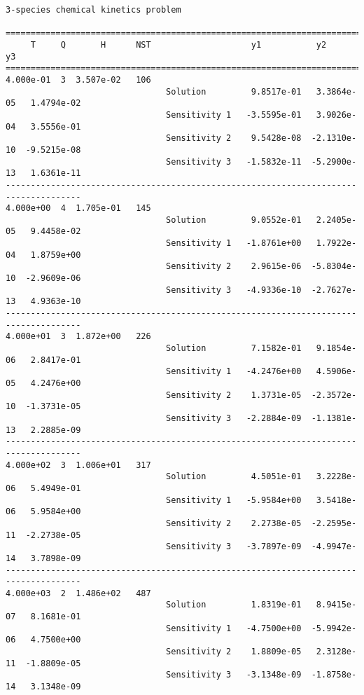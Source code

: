 \begin{verbatim}
3-species chemical kinetics problem

=====================================================================================
     T     Q       H      NST                    y1           y2           y3    
=====================================================================================
4.000e-01  3  3.507e-02   106
                                Solution         9.8517e-01   3.3864e-05   1.4794e-02 
                                Sensitivity 1   -3.5595e-01   3.9026e-04   3.5556e-01 
                                Sensitivity 2    9.5428e-08  -2.1310e-10  -9.5215e-08 
                                Sensitivity 3   -1.5832e-11  -5.2900e-13   1.6361e-11 
-------------------------------------------------------------------------------------
4.000e+00  4  1.705e-01   145
                                Solution         9.0552e-01   2.2405e-05   9.4458e-02 
                                Sensitivity 1   -1.8761e+00   1.7922e-04   1.8759e+00 
                                Sensitivity 2    2.9615e-06  -5.8304e-10  -2.9609e-06 
                                Sensitivity 3   -4.9336e-10  -2.7627e-13   4.9363e-10 
-------------------------------------------------------------------------------------
4.000e+01  3  1.872e+00   226
                                Solution         7.1582e-01   9.1854e-06   2.8417e-01 
                                Sensitivity 1   -4.2476e+00   4.5906e-05   4.2476e+00 
                                Sensitivity 2    1.3731e-05  -2.3572e-10  -1.3731e-05 
                                Sensitivity 3   -2.2884e-09  -1.1381e-13   2.2885e-09 
-------------------------------------------------------------------------------------
4.000e+02  3  1.006e+01   317
                                Solution         4.5051e-01   3.2228e-06   5.4949e-01 
                                Sensitivity 1   -5.9584e+00   3.5418e-06   5.9584e+00 
                                Sensitivity 2    2.2738e-05  -2.2595e-11  -2.2738e-05 
                                Sensitivity 3   -3.7897e-09  -4.9947e-14   3.7898e-09 
-------------------------------------------------------------------------------------
4.000e+03  2  1.486e+02   487
                                Solution         1.8319e-01   8.9415e-07   8.1681e-01 
                                Sensitivity 1   -4.7500e+00  -5.9942e-06   4.7500e+00 
                                Sensitivity 2    1.8809e-05   2.3128e-11  -1.8809e-05 
                                Sensitivity 3   -3.1348e-09  -1.8758e-14   3.1348e-09 

\end{verbatim}
